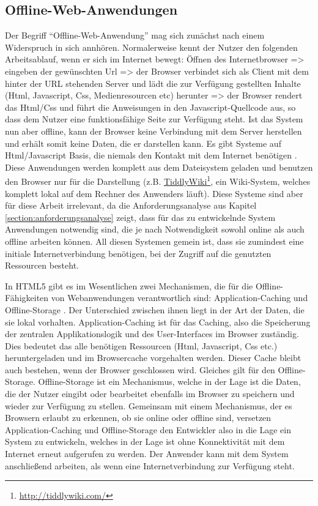 \subsection{Offline-Web-Anwendungen}
Der Begriff "`Offline-Web-Anwendung"' mag sich zunächst nach einem Widerspruch in sich annhören. Normalerweise kennt der Nutzer den folgenden Arbeitsablauf, wenn er sich im Internet bewegt: Öffnen des Internetbrowser => eingeben der gewünschten Url => der Browser verbindet sich als Client mit dem hinter der URL stehenden Server und lädt die zur Verfügung gestellten Inhalte (Html, Javascript, Css, Medienresourcen etc) herunter => der Browser rendert das Html/Css und führt die Anweisungen in den Javascript-Quellcode aus, so dass dem Nutzer eine funktionsfähige Seite zur Verfügung steht. Ist das System nun aber offline, kann der Browser keine Verbindung mit dem Server herstellen und erhält somit keine Daten, die er darstellen kann. Es gibt Systeme auf Html/Javascript Basis, die niemals den Kontakt mit dem Internet benötigen \cite{html5_rocks_offline_what_does_it_mean}. Diese Anwendungen werden komplett aus dem Dateisystem geladen und benutzen den Browser nur für die Darstellung (z.B. \href{http://tiddlywiki.com/}{TiddlyWiki}\footnote{\url{http://tiddlywiki.com/}}, ein Wiki-System, welches komplett lokal auf dem Rechner des Anwenders läuft). Diese Systeme sind aber für diese Arbeit irrelevant, da die Anforderungsanalyse aus Kapitel \ref{section:anforderungsanalyse} zeigt, dass für das zu entwickelnde System Anwendungen notwendig sind, die je nach Notwendigkeit sowohl online als auch offline arbeiten können. All diesen Systemen gemein ist, dass sie zumindest eine initiale Internetverbindung benötigen, bei der Zugriff auf die genutzten Ressourcen besteht. 

In HTML5 gibt es im Wesentlichen zwei Mechanismen, die für die Offline-Fähigkeiten von Webanwendungen verantwortlich sind: Application-Caching und Offline-Storage \cite{html5_rocks_offline_what_does_it_mean}. Der Unterschied zwischen ihnen liegt in der Art der Daten, die sie lokal vorhalten. Application-Caching ist für das Caching, also die Speicherung der zentralen Applikationslogik und des User-Interfaces im Browser zuständig. Dies bedeutet das alle benötigen Ressourcen (Html, Javascript, Css etc.) heruntergeladen und im Browsercache vorgehalten werden. Dieser Cache bleibt auch bestehen, wenn der Browser geschlossen wird. Gleiches gilt für den Offline-Storage. Offline-Storage ist ein Mechanismus, welche in der Lage ist die Daten, die der Nutzer eingibt oder bearbeitet ebenfalls im Browser zu speichern und wieder zur Verfügung zu stellen. Gemeinsam mit einem Mechanismus, der es Browsern erlaubt zu erkennen, ob sie online oder offline sind, versetzen Application-Caching und Offline-Storage den Entwickler also in die Lage ein System zu entwickeln, welches in der Lage ist ohne Konnektivität mit dem Internet erneut aufgerufen zu werden. Der Anwender kann mit dem System anschließend arbeiten, als wenn eine Internetverbindung zur Verfügung steht.

